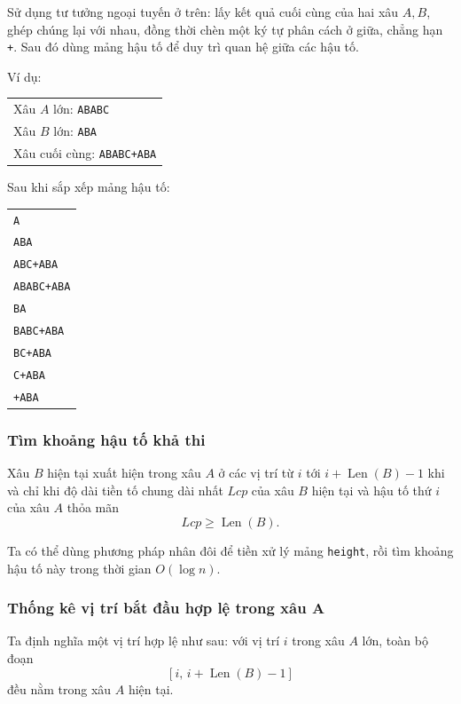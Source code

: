 \documentclass[11pt]{article}
\begin{document}
Sử dụng tư tưởng ngoại tuyến ở trên: lấy kết quả cuối cùng của hai xâu
\(A,B\), ghép chúng lại với nhau, đồng thời chèn một ký tự phân cách ở giữa,
chẳng hạn \texttt{+}. Sau đó dùng mảng hậu tố để duy trì quan hệ giữa các
hậu tố.

Ví dụ:

\begin{center}
\begin{tabular}{l}
Xâu \(A\) lớn: \texttt{ABABC} \\
Xâu \(B\) lớn: \texttt{ABA} \\
Xâu cuối cùng: \texttt{ABABC+ABA}
\end{tabular}
\end{center}

Sau khi sắp xếp mảng hậu tố:

\begin{center}
\begin{tabular}{l}
\texttt{A} \\
\texttt{ABA} \\
\texttt{ABC+ABA} \\
\texttt{ABABC+ABA} \\
\texttt{BA} \\
\texttt{BABC+ABA} \\
\texttt{BC+ABA} \\
\texttt{C+ABA} \\
\texttt{+ABA}
\end{tabular}
\end{center}

\subsubsection{Tìm khoảng hậu tố khả thi}

Xâu \(B\) hiện tại xuất hiện trong xâu \(A\) ở các vị trí từ \(i\) tới
\(i+\operatorname{Len}(B)-1\) khi và chỉ khi độ dài tiền tố chung dài nhất
\(Lcp\) của xâu \(B\) hiện tại và hậu tố thứ \(i\) của xâu \(A\) thỏa mãn
\[
  Lcp\ge \operatorname{Len}(B).
\]

Ta có thể dùng phương pháp nhân đôi để tiền xử lý mảng \texttt{height}, rồi
tìm khoảng hậu tố này trong thời gian \(O(\log n)\).

\subsubsection{Thống kê vị trí bắt đầu hợp lệ trong xâu A}

Ta định nghĩa một vị trí hợp lệ như sau: với vị trí \(i\) trong xâu \(A\)
lớn, toàn bộ đoạn
\[
  [i,\, i+\operatorname{Len}(B)-1]
\]
đều nằm trong xâu \(A\) hiện tại.
\end{document}
